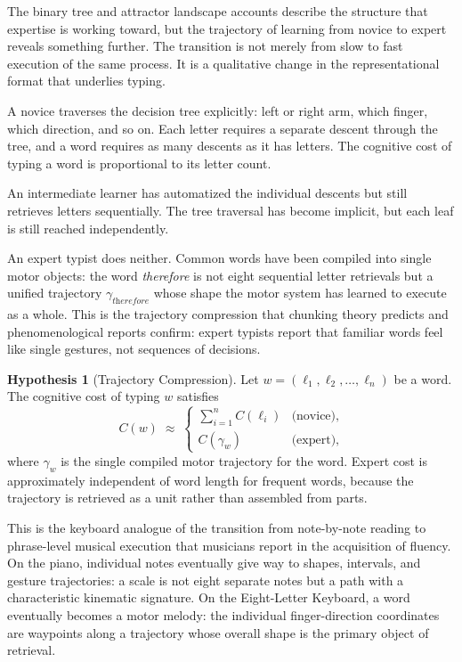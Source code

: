 \documentclass[12pt,a4paper]{article}
\theoremstyle{plain}
\theoremstyle{definition}
\newtheorem{hypothesis}{Hypothesis}
\theoremstyle{remark}
\begin{document}
The binary tree and attractor landscape accounts describe the structure that
expertise is working toward, but the trajectory of learning from novice to
expert reveals something further. The transition is not merely from slow to
fast execution of the same process. It is a qualitative change in the
representational format that underlies typing.

A novice traverses the decision tree explicitly: left or right arm, which
finger, which direction, and so on. Each letter requires a separate descent
through the tree, and a word requires as many descents as it has letters. The
cognitive cost of typing a word is proportional to its letter count.

An intermediate learner has automatized the individual descents but still
retrieves letters sequentially. The tree traversal has become implicit, but
each leaf is still reached independently.

An expert typist does neither. Common words have been compiled into single
motor objects: the word \textit{therefore} is not eight sequential letter
retrievals but a unified trajectory $\gamma_{\textit{therefore}}$ whose shape
the motor system has learned to execute as a whole. This is the trajectory
compression that chunking theory predicts and phenomenological reports confirm:
expert typists report that familiar words feel like single gestures, not
sequences of decisions.

\begin{hypothesis}[Trajectory Compression]
Let $w = (\ell_1, \ell_2, \ldots, \ell_n)$ be a word. The cognitive cost
of typing $w$ satisfies
\[
  C(w)
  \;\approx\;
  \begin{cases}
    \displaystyle\sum_{i=1}^n C(\ell_i) & \text{(novice)}, \\[8pt]
    C(\gamma_w) & \text{(expert)},
  \end{cases}
\]
where $\gamma_w$ is the single compiled motor trajectory for the word. Expert
cost is approximately independent of word length for frequent words, because
the trajectory is retrieved as a unit rather than assembled from parts.
\end{hypothesis}

This is the keyboard analogue of the transition from note-by-note reading to
phrase-level musical execution that musicians report in the acquisition of
fluency. On the piano, individual notes eventually give way to shapes,
intervals, and gesture trajectories: a scale is not eight separate notes but
a path with a characteristic kinematic signature. On the Eight-Letter Keyboard,
a word eventually becomes a motor melody: the individual finger-direction
coordinates are waypoints along a trajectory whose overall shape is the
primary object of retrieval.
\end{document}

